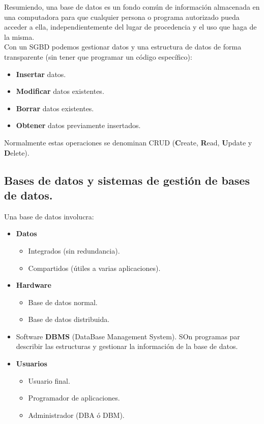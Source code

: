 \documentclass[12pt,spanish]{article}
\begin{document}
Resumiendo, una base de datos es un fondo común de información almacenada en una computadora para que cualquier persona o programa autorizado pueda acceder a ella, independientemente del lugar de procedencia  y el uso que haga de la misma.\\

Con un SGBD podemos gestionar datos y una estructura de datos de forma transparente (sin tener que programar un código específico):
	\begin{itemize}
		\item \textbf{Insertar} datos.
		\item \textbf{Modificar} datos existentes.
		\item \textbf{Borrar} datos existentes.
		\item \textbf{Obtener} datos previamente insertados.
	\end{itemize}
Normalmente estas operaciones se denominan CRUD (\textbf{C}reate, \textbf{R}ead, \textbf{U}pdate y \textbf{D}elete).


\subsection{Bases de datos y sistemas de gestión de bases de datos.}

Una base de datos involucra:

\begin{itemize}
	\item \textbf{Datos}
		\begin{itemize}
			\item Integrados (sin redundancia).
			\item Compartidos (útiles a varias aplicaciones).
		\end{itemize}
		\item \textbf{Hardware}
			\begin{itemize}
				\item Base de datos normal.
				\item Base de datos distribuida.
			\end{itemize}
		\item Software \textbf{DBMS} (DataBase Management System). SOn programas par describir las estructuras y gestionar la información de la base de datos.
		\item \textbf{Usuarios}
			\begin{itemize}
				\item Usuario final.
				\item Programador de aplicaciones.
				\item Administrador (DBA ó DBM).
			\end{itemize}
\end{itemize}
\end{document}
